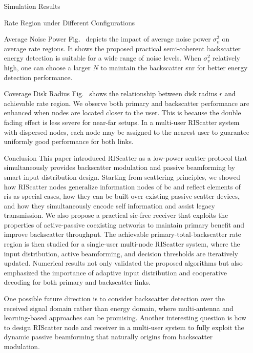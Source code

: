 \documentclass[journal]{IEEEtran}
\begin{document}
\begin{section}{Simulation Results}
\begin{subsection}{Rate Region under Different Configurations}
		\begin{subsubsection}{Average Noise Power}
			Fig.~ depicts the impact of average noise power $\sigma_v^2$ on average rate regions.
			It shows the proposed practical semi-coherent backscatter energy detection is suitable for a wide range of noise levels.
			When $\sigma_v^2$ relatively high, one can choose a larger $N$ to maintain the backscatter \gls{snr} for better energy detection performance.
		\end{subsubsection}

		\begin{subsubsection}{Coverage Disk Radius}
			Fig.~ shows the relationship between disk radius $r$ and achievable rate region.
			We observe both primary and backscatter performance are enhanced when nodes are located closer to the user.
			This is because the double fading effect is less severe for near-far setups.
			In a multi-user RIScatter system with dispersed nodes, each node may be assigned to the nearest user to guarantee uniformly good performance for both links.
		\end{subsubsection}
	\end{subsection}
	\label{st:simulation_results}
\end{section}

\begin{section}{Conclusion}
	This paper introduced RIScatter as a low-power scatter protocol that simultaneously provides backscatter modulation and passive beamforming by smart input distribution design.
	Starting from scattering principles, we showed how RIScatter nodes generalize information nodes of \gls{bc} and reflect elements of \gls{ris} as special cases, how they can be built over existing passive scatter devices, and how they simultaneously encode self information and assist legacy transmission.
	We also propose a practical \gls{sic}-free receiver that exploits the properties of active-passive coexisting networks to maintain primary benefit and improve backscatter throughput.
	The achievable primary-total-backscatter rate region is then studied for a single-user multi-node RIScatter system, where the input distribution, active beamforming, and decision thresholds are iteratively updated.
	Numerical results not only validated the proposed algorithms but also emphasized the importance of adaptive input distribution and cooperative decoding for both primary and backscatter links.

	One possible future direction is to consider backscatter detection over the received signal domain rather than energy domain, where multi-antenna \cite{Liu2022c} and learning-based approaches can be promising.
	Another interesting question is how to design RIScatter node and receiver in a multi-user system to fully exploit the dynamic passive beamforming that naturally origins from backscatter modulation.
\end{section}
\end{document}
